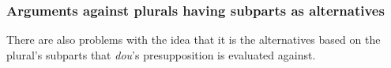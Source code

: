 \documentclass[12pt]{article}
\begin{document}
%   
%   



\subsubsection{Arguments against plurals having subparts as alternatives}
\label{ssub:arguments_against_plurals_having_subparts_as_alternatives}

There are also problems with the idea that it is the alternatives based on the plural's subparts that \emph{dou}'s presupposition is evaluated against.
\end{document}
